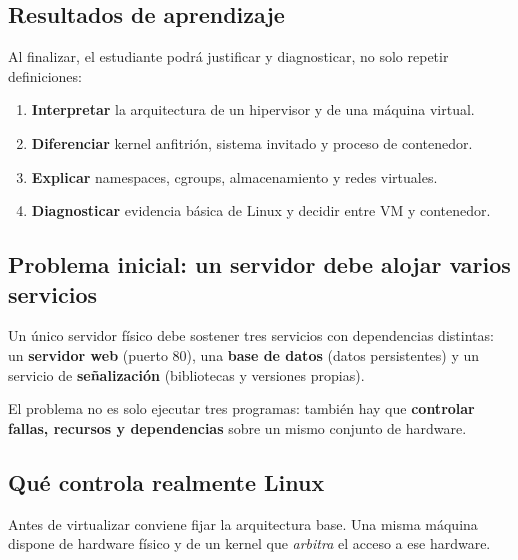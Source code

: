 \documentclass[11pt,a4paper]{article}
\begin{document}
\subsection*{Resultados de aprendizaje}

Al finalizar, el estudiante podrá justificar y diagnosticar, no solo repetir definiciones:

\begin{enumerate}[label=\textbf{\arabic*.}]
  \item \textbf{Interpretar} la arquitectura de un hipervisor y de una máquina virtual.
  \item \textbf{Diferenciar} kernel anfitrión, sistema invitado y proceso de contenedor.
  \item \textbf{Explicar} namespaces, cgroups, almacenamiento y redes virtuales.
  \item \textbf{Diagnosticar} evidencia básica de Linux y decidir entre VM y contenedor.
\end{enumerate}

\subsection*{Problema inicial: un servidor debe alojar varios servicios}

Un único servidor físico debe sostener tres servicios con dependencias distintas:
un \textbf{servidor web} (puerto 80), una \textbf{base de datos} (datos persistentes)
y un servicio de \textbf{señalización} (bibliotecas y versiones propias).

\begin{clave}
El problema no es solo ejecutar tres programas: también hay que \textbf{controlar fallas,
recursos y dependencias} sobre un mismo conjunto de hardware.
\end{clave}

\subsection*{Qué controla realmente Linux}

Antes de virtualizar conviene fijar la arquitectura base. Una misma máquina dispone de
hardware físico y de un kernel que \emph{arbitra} el acceso a ese hardware.

\begin{center}
\end{center}
\end{document}
